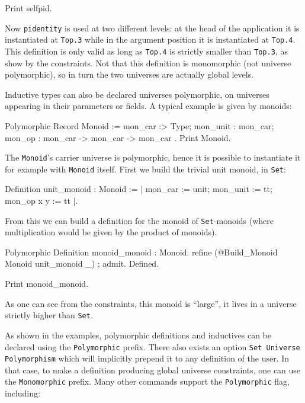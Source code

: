 \begin{coq_example}
Print selfpid.
\end{coq_example}

Now \texttt{pidentity} is used at two different levels: at the head of
the application it is instantiated at \texttt{Top.3} while in the
argument position it is instantiated at \texttt{Top.4}. This definition
is only valid as long as \texttt{Top.4} is strictly smaller than
\texttt{Top.3}, as show by the constraints. Not that this definition is
monomorphic (not universe polymorphic), so in turn the two universes are
actually global levels.

Inductive types can also be declared universes polymorphic, on universes
appearing in their parameters or fields. A typical example is given by
monoids:

\begin{coq_example}
Polymorphic Record Monoid := { mon_car :> Type; mon_unit : mon_car; 
  mon_op : mon_car -> mon_car -> mon_car }.
Print Monoid.
\end{coq_example}

The \texttt{Monoid}'s carrier universe is polymorphic, hence it is
possible to instantiate it for example with \texttt{Monoid} itself.
First we build the trivial unit monoid, in \texttt{Set}:
\begin{coq_example}
Definition unit_monoid : Monoid := 
  {| mon_car := unit; mon_unit := tt; mon_op x y := tt |}.
\end{coq_example} 

From this we can build a definition for the monoid of
\texttt{Set}-monoids (where multiplication would be given by the product
of monoids).

\begin{coq_example*}
Polymorphic Definition monoid_monoid : Monoid.
  refine (@Build_Monoid Monoid unit_monoid _) ; admit.
Defined.
\end{coq_example*}
\begin{coq_example}
Print monoid_monoid.
\end{coq_example} 

As one can see from the constraints, this monoid is ``large'', it lives
in a universe strictly higher than \texttt{Set}.


As shown in the examples, polymorphic definitions and inductives can be
declared using the \texttt{Polymorphic} prefix. There also exists an
option \texttt{Set Universe Polymorphism} which will implicitly prepend
it to any definition of the user. In that case, to make a definition
producing global universe constraints, one can use the
\texttt{Monomorphic} prefix. Many other commands support the
\texttt{Polymorphic} flag, including:

